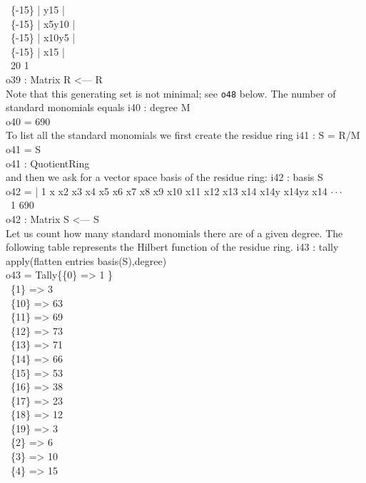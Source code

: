 \      \{-15\} | y15    |\\
\      \{-15\} | x5y10  |\\
\      \{-15\} | x10y5  |\\
\      \{-15\} | x15    |\\
\emptyLine
\              20       1\\
o39 : Matrix R   <--- R\\
\endOutput
Note that this generating set is not minimal; see {\tt o48} below.
The number of standard monomials equals
\beginOutput
i40 : degree M\\
\emptyLine
o40 = 690\\
\endOutput
To list all the standard monomials we first create the residue ring
\beginOutput
i41 : S = R/M\\
\emptyLine
o41 = S\\
\emptyLine
o41 : QuotientRing\\
\endOutput
and then we ask for a vector space basis of the residue ring:
\beginOutput
i42 : basis S\\
\emptyLine
o42 = | 1 x x2 x3 x4 x5 x6 x7 x8 x9 x10 x11 x12 x13 x14 x14y x14yz x14 $\cdot\cdot\cdot$\\
\emptyLine
\              1       690\\
o42 : Matrix S  <--- S\\
\endOutput
Let us count how many standard monomials there are of a given degree.
The following table represents the Hilbert function
of the residue ring.
\beginOutput
i43 : tally apply(flatten entries basis(S),degree)\\
\emptyLine
o43 = Tally\{\{0\} => 1  \}\\
\            \{1\} => 3\\
\            \{10\} => 63\\
\            \{11\} => 69\\
\            \{12\} => 73\\
\            \{13\} => 71\\
\            \{14\} => 66\\
\            \{15\} => 53\\
\            \{16\} => 38\\
\            \{17\} => 23\\
\            \{18\} => 12\\
\            \{19\} => 3\\
\            \{2\} => 6\\
\            \{3\} => 10\\
\            \{4\} => 15\\
